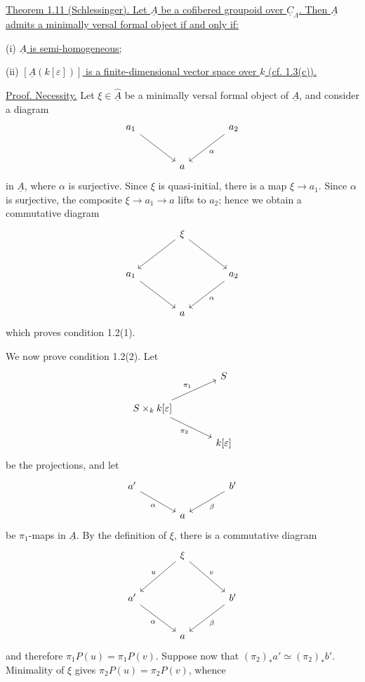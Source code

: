 
\underline{Theorem 1.11 (Schlessinger). Let $\underline A$ be a
cofibered groupoid over $\underline C_\Lambda$. Then $\underline A$
admits a minimally versal formal object if and only if:}


(i) \underline{$\underline A$ is semi-homogeneous;}

(ii) \underline{$[\underline A(k[\varepsilon])]$ is a
finite-dimensional vector space over $k$ (cf. 1.3(c)).}

\underline{Proof. Necessity.} Let $\xi\in\widehat{\underline A}$ be a
minimally versal formal object of $\underline A$, and consider a
diagram
\[
\begin{tikzcd}[column sep=large,row sep=large]
a_1 \arrow[dr] & & a_2 \arrow[dl,"\alpha"] \\
& a &
\end{tikzcd}
\]
in $\underline A$, where $\alpha$ is surjective. Since $\xi$ is
quasi-initial, there is a map $\xi\longrightarrow a_1$. Since
$\alpha$ is surjective, the composite
$\xi\longrightarrow a_1\longrightarrow a$ lifts to $a_2$; hence we
obtain a commutative diagram
\[
\begin{tikzcd}[column sep=large,row sep=large]
& \xi \arrow[dl] \arrow[dr] & \\
a_1 \arrow[dr] & & a_2 \arrow[dl,"\alpha"] \\
& a &
\end{tikzcd}
\]
which proves condition 1.2(1).

We now prove condition 1.2(2). Let
\[
\begin{tikzcd}[column sep=large]
& S \\
S\times_k k[\varepsilon]
 \arrow[ur,"\pi_1"] \arrow[dr,"\pi_2"'] & \\
& k[\varepsilon]
\end{tikzcd}
\]
be the projections, and let
\[
\begin{tikzcd}[column sep=large]
a' \arrow[dr,"\alpha"'] & & b' \arrow[dl,"\beta"] \\
& a &
\end{tikzcd}
\]
be $\pi_1$-maps in $\underline A$. By the definition of $\xi$, there
is a commutative diagram
\[
\begin{tikzcd}[column sep=large,row sep=large]
& \xi \arrow[dl,"u"'] \arrow[dr,"v"] & \\
a' \arrow[dr,"\alpha"'] & & b' \arrow[dl,"\beta"] \\
& a &
\end{tikzcd}
\]
and therefore $\pi_1P(u)=\pi_1P(v)$. Suppose now that
$(\pi_2)_*a'\simeq(\pi_2)_*b'$. Minimality of $\xi$ gives
$\pi_2P(u)=\pi_2P(v)$, whence

